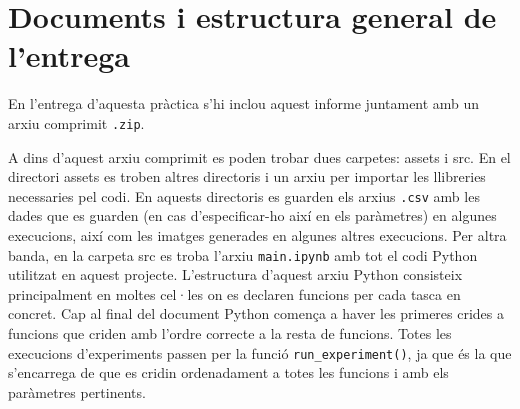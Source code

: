 \section{Documents i estructura general de l'entrega}
En l'entrega d'aquesta pràctica s'hi inclou aquest informe juntament amb un arxiu comprimit \texttt{.zip}. 

A dins d'aquest arxiu comprimit es poden trobar dues carpetes: assets i src. En el directori assets es troben altres directoris i un arxiu per importar les llibreries necessaries pel codi. En aquests directoris es guarden els arxius \texttt{.csv} amb les dades que es guarden (en cas d'especificar-ho així en els paràmetres) en algunes execucions, així com les imatges generades en algunes altres execucions. Per altra banda, en la carpeta src es troba l'arxiu \texttt{main.ipynb} amb tot el codi Python utilitzat en aquest projecte. L'estructura d'aquest arxiu Python consisteix principalment en moltes cel·les on es declaren funcions per cada tasca en concret. Cap al final del document Python comença a haver les primeres crides a funcions que criden amb l'ordre correcte a la resta de funcions. Totes les execucions d'experiments passen per la funció \texttt{run\_experiment()}, ja que és la que s'encarrega de que es cridin ordenadament a totes les funcions i amb els paràmetres pertinents.